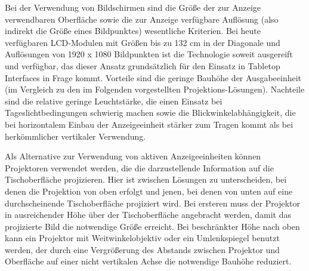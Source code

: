 Bei der Verwendung von Bildschirmen sind die Größe der zur Anzeige verwendbaren Oberfläche sowie die zur Anzeige verfügbare Auflösung (also indirekt die Größe eines Bildpunktes) wesentliche Kriterien. Bei heute verfügbaren \gls{LCD}-Modulen mit Größen bis zu 132 cm in der Diagonale und Auflösungen von 1920 x 1080 Bildpunkten ist die Technologie soweit ausgereift und verfügbar, das dieser Ansatz grundsätzlich für den Einsatz in Tabletop Interfaces in Frage kommt. Vorteile sind die geringe Bauhöhe der Ausgabeeinheit (im Vergleich zu den im Folgenden vorgestellten Projektions-Lösungen). Nachteile sind die relative geringe Leuchtstärke, die einen Einsatz bei Tageslichtbedingungen schwierig machen sowie die Blickwinkelabhängigkeit, die bei horizontalem Einbau der Anzeigeeinheit stärker zum Tragen kommt als bei herkömmlicher vertikaler Verwendung.

Als Alternative zur Verwendung von aktiven Anzeigeeinheiten können Projektoren verwendet werden, die die darzustellende Information auf die Tischoberfläche projizieren. Hier ist zwischen Lösungen zu unterscheiden, bei denen die Projektion von oben erfolgt und jenen, bei denen von unten auf eine durchscheinende Tischoberfläche projiziert wird. Bei ersteren muss der Projektor in ausreichender Höhe über der Tischoberfläche angebracht werden, damit das projizierte Bild die notwendige Größe erreicht. Bei beschränkter Höhe nach oben kann ein Projektor mit Weitwinkelobjektiv oder ein Umlenkspiegel benutzt werden, der durch eine Vergrößerung des Abstands zwischen Projektor und Oberfläche auf einer nicht vertikalen Achse die notwendige Bauhöhe reduziert. 

